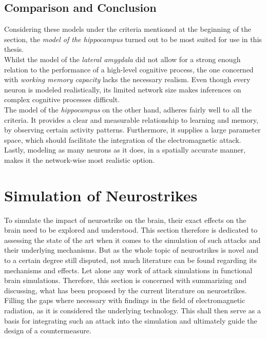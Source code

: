    \subsection{Comparison and Conclusion}
    Considering these models under the criteria mentioned at the beginning of the section, the \textit{model of the hippocampus} turned out to be most suited for use in this thesis.\\
    Whilst the model of the \textit{lateral amygdala} did not allow for a strong enough relation to the performance of a high-level cognitive process, the one concerned with \textit{working memory capacity} lacks the necessary realism. Even though every neuron is modeled realistically, its limited network size makes inferences on complex cognitive processes difficult.\\
    The model of the \textit{hippocampus} on the other hand, adheres fairly well to all the criteria. It provides a clear and measurable relationship to learning and memory, by observing certain activity patterns. Furthermore, it supplies a large parameter space, which should facilitate the integration of the electromagnetic attack. Lastly, modeling as many neurons as it does, in a spatially accurate manner, makes it the network-wise most realistic option.
    


\section{Simulation of Neurostrikes}
    To simulate the impact of neurostrike on the brain, their exact effects on the brain need to be explored and understood. This section therefore is dedicated to assessing the state of the art when it comes to the simulation of such attacks and their underlying mechanisms. But as the whole topic of neurostrikes is novel and to a certain degree still disputed, not much literature can be found regarding its mechanisms and effects. Let alone any work of attack simulations in functional brain simulations. Therefore, this section is concerned with summarizing and discussing, what has been proposed by the current literature on neurostrikes. Filling the gaps where necessary with findings in the field of electromagnetic radiation, as it is considered the underlying technology. This shall then serve as a basis for integrating such an attack into the simulation and ultimately guide the design of a countermeasure.

